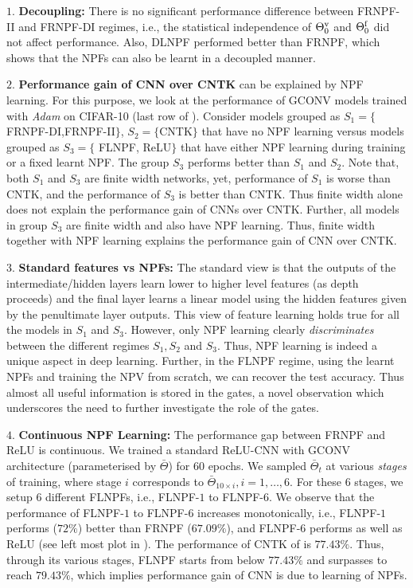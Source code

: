\documentclass{article}
\begin{document}
$1.$ \textbf{Decoupling:} There is no significant performance difference between FRNPF-II and FRNPF-DI regimes, i.e., the statistical independence of ${\Theta}^{\text{v}}_0$ and $\Theta^{\textrm{f}}_0$ did not affect performance. Also, DLNPF performed better than FRNPF, which shows  that the NPFs can also be learnt in a decoupled manner.

$2.$ \textbf{Performance gain of CNN over CNTK} can be explained by NPF learning. For this purpose, we look at the performance of GCONV models trained with \emph{Adam} on CIFAR-10 (last row of ). Consider models grouped as $S_1=\{$FRNPF-DI,FRNPF-II$\}$, $S_2=\{$CNTK$\}$ that have no NPF learning versus models grouped as $S_3=\{$ FLNPF, ReLU$\}$ that have either NPF learning during training or a fixed learnt NPF. The group $S_3$ performs better than $S_1$ and $S_2$. Note that, both $S_1$ and $S_3$ are finite width networks, yet, performance of $S_1$ is worse than CNTK, and the performance of $S_3$ is better than CNTK. Thus finite width alone does not explain the performance gain of CNNs over CNTK. Further, all models in group $S_3$ are finite width and also have NPF learning. Thus, finite width together with NPF learning explains the performance gain of CNN over CNTK. 

$3.$ \textbf{Standard features vs NPFs:} The standard view is that the outputs of the intermediate/hidden layers learn lower to higher level features (as depth proceeds) and the final layer learns a linear model using the hidden features given by the penultimate layer outputs. This view of feature learning holds true for all the models in $S_1$ and $S_3$. However, only NPF learning clearly \emph{discriminates} between the different regimes $S_1, S_2$ and $S_3$. Thus, NPF learning is indeed a unique aspect in deep learning. Further, in the FLNPF regime, using the learnt NPFs and training the NPV from scratch, we can recover the test accuracy. Thus almost all useful information is stored in the gates, a novel observation which underscores the need to further investigate the role of the gates.

$4.$ \textbf{Continuous NPF Learning:} The performance gap between FRNPF and ReLU is continuous. We trained a standard ReLU-CNN with GCONV architecture (parameterised by $\bar{\Theta}$) for $60$ epochs. We sampled $\bar{\Theta}_t$ at various \emph{stages} of training, where stage $i$ corresponds to $\bar{\Theta}_{10\times i}, i=1,\ldots,6$. For these $6$ stages, we setup $6$ different FLNPFs, i.e., FLNPF-$1$ to FLNPF-$6$. We observe that the performance of FLNPF-$1$ to FLNPF-$6$ increases monotonically, i.e., FLNPF-$1$ performs ($72\%$) better than FRNPF ($67.09\%$),  and FLNPF-$6$ performs as well as ReLU (see left most plot in ). The performance of CNTK of \cite{arora2019exact} is $77.43\%$. Thus, through its various stages, FLNPF starts from below $77.43\%$ and surpasses to reach $79.43\%$, which implies performance gain of CNN is due to learning of NPFs.
\end{document}
